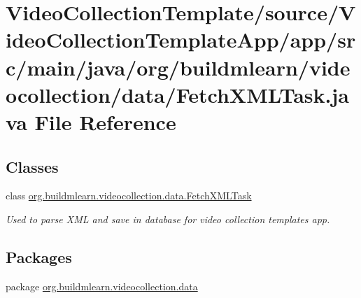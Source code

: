 \hypertarget{VideoCollectionTemplate_2source_2VideoCollectionTemplateApp_2app_2src_2main_2java_2org_2buildmle442a1e75e2d4752f5c561bd146e64015}{}\section{Video\+Collection\+Template/source/\+Video\+Collection\+Template\+App/app/src/main/java/org/buildmlearn/videocollection/data/\+Fetch\+X\+M\+L\+Task.java File Reference}
\label{VideoCollectionTemplate_2source_2VideoCollectionTemplateApp_2app_2src_2main_2java_2org_2buildmle442a1e75e2d4752f5c561bd146e64015}
\subsection*{Classes}
\begin{DoxyCompactItemize}
\item 
class \hyperlink{classorg_1_1buildmlearn_1_1videocollection_1_1data_1_1FetchXMLTask}{org.\+buildmlearn.\+videocollection.\+data.\+Fetch\+X\+M\+L\+Task}
\begin{DoxyCompactList}\small\item\em Used to parse X\+ML and save in database for video collection template\textquotesingle{}s app. \end{DoxyCompactList}\end{DoxyCompactItemize}
\subsection*{Packages}
\begin{DoxyCompactItemize}
\item 
package \hyperlink{namespaceorg_1_1buildmlearn_1_1videocollection_1_1data}{org.\+buildmlearn.\+videocollection.\+data}
\end{DoxyCompactItemize}
